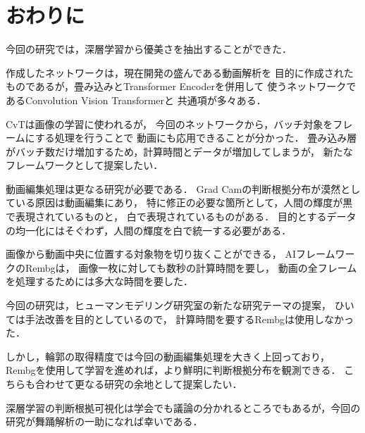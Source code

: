 \section{おわりに}
今回の研究では，深層学習から優美さを抽出することができた．

作成したネットワークは，現在開発の盛んである動画解析を
目的に作成されたものであるが，畳み込みとTransformer Encoderを併用して
使うネットワークであるConvolution Vision Transformer\cite{cvt}と
共通項が多々ある．

CvTは画像の学習に使われるが，
今回のネットワークから，バッチ対象をフレームにする処理を行うことで
動画にも応用できることが分かった．
畳み込み層がバッチ数だけ増加するため，計算時間とデータが増加してしまうが，
新たなフレームワークとして提案したい．

動画編集処理は更なる研究が必要である．
Grad Camの判断根拠分布が漠然としている原因は動画編集にあり，
特に修正の必要な箇所として，人間の輝度が黒で表現されているものと，
白で表現されているものがある．
目的とするデータの均一化にはそぐわず，人間の輝度を白で統一する必要がある．

画像から動画中央に位置する対象物を切り抜くことができる，
AIフレームワークのRembg\cite{Rembg}は，
画像一枚に対しても数秒の計算時間を要し，
動画の全フレームを処理するためには多大な時間を要した．

今回の研究は，ヒューマンモデリング研究室の新たな研究テーマの提案，
ひいては手法改善を目的としているので，
計算時間を要するRembgは使用しなかった．

しかし，輪郭の取得精度では今回の動画編集処理を大きく上回っており，
Rembgを使用して学習を進めれば，より鮮明に判断根拠分布を観測できる．
こちらも合わせて更なる研究の余地として提案したい．

深層学習の判断根拠可視化は学会でも議論の分かれるところでもあるが，今回の研究が舞踊解析の一助になれば幸いである．